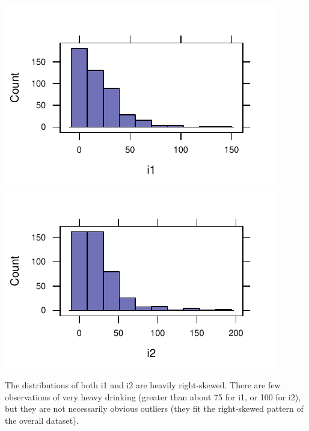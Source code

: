 \documentclass[twoside]{book}\usepackage[]{graphicx}\usepackage[]{xcolor}
\makeatletter
\def\maxwidth{ %
  \ifdim\Gin@nat@width>\linewidth
    \linewidth
  \else
    \Gin@nat@width
  \fi
}
\newenvironment{knitrout}{}{} %
\makeatother
\begin{document}
\begin{solution}
\begin{knitrout}
{\centering \includegraphics[width=\maxwidth]{figures/fig-unnamed-chunk-33-1} 
\includegraphics[width=\maxwidth]{figures/fig-unnamed-chunk-33-2} 

}



\end{knitrout}
The distributions of both i1 and i2 are heavily right-skewed. There are few observations of very heavy drinking (greater than about 75 for i1, or 100 for i2), but they are not necessarily obvious outliers (they fit the right-skewed pattern of the overall dataset).
\end{solution}
\end{document}

